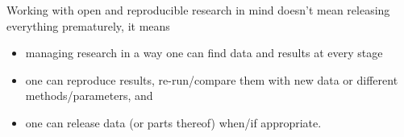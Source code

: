 \begin{frame}{}
Working with open and reproducible research in mind doesn't mean
releasing everything prematurely, it means

\begin{itemize}
\item managing research in a way one can find data and results at
  every stage

\item one can reproduce results, re-run/compare them with new data or
  different methods/parameters, and

\item  one can release data (or parts thereof) when/if appropriate.
\end{itemize}
\end{frame}











